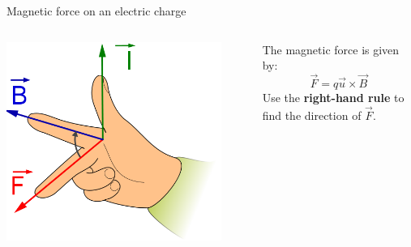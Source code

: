 \begin{frame}{Magnetic force on an electric charge}

\begin{columns}
  \begin{column}{0.27\textwidth}
    \begin{center}
      \includegraphics[width=0.90\textwidth]{./images/schematics/right_hand_rule_fbi.png}\\
    \end{center}
  \end{column}
  \begin{column}{0.73\textwidth}
      The magnetic force is given by:
      \begin{equation*}
          \vec{F} = q \vec{u} \times \vec{B}
      \end{equation*}
       Use the {\bf right-hand rule} to find the direction of $\vec{F}$.
  \end{column}
\end{columns}


\end{frame}
